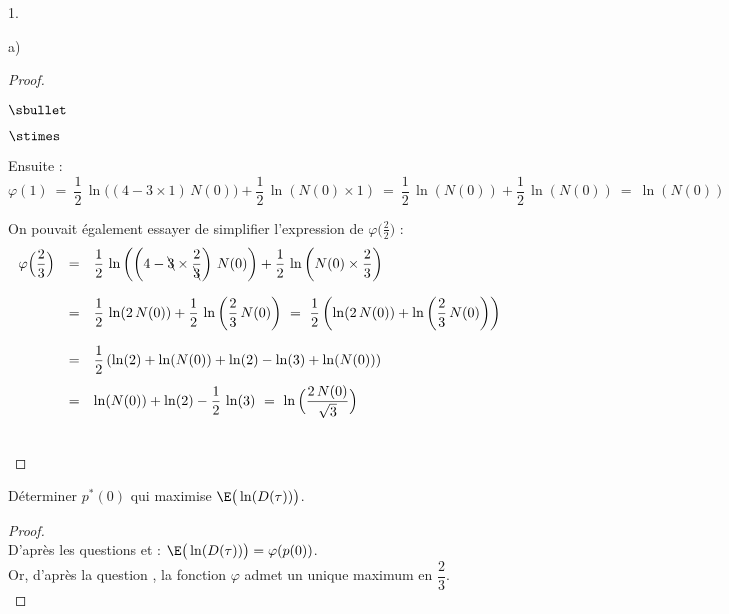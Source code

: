 \begin{noliste}{1.}
\begin{noliste}{a)}
\begin{proof}
\begin{noliste}{$\sbullet$}
\begin{noliste}{$\stimes$}
	\item Ensuite :
	\[
	  \varphi(1) \ = \ \dfrac{1}{2} \, \ln\big( (4-3\times 1) \,
	  N(0)\big) + \dfrac{1}{2} \, \ln(N(0) \times 1) \ = \
	  \dfrac{1}{2} \, \ln(N(0)) + \dfrac{1}{2} \, \ln(N(0))
	  \ = \ \ln(N(0))
	\]
      \end{noliste}
      \end{noliste}
      
      \begin{remark}
        On pouvait également essayer de simplifier l'expression de 
        $\varphi\big(\frac{2}{2}\big)$ :
        \[
          \begin{array}{rcl}
            \varphi\Big(\dfrac{2}{3}\Big) &=& \dfrac{1}{2} \, \ln\left( 
	    \left(4 - \bcancel{3} \times \dfrac{2}{\bcancel{3}}\right) 
	    \, N(0)\right) + \dfrac{1}{2} \, \ln\left(N(0) \times 
	    \dfrac{2}{3}\right)
	    \\[.6cm]
	    &=& \dfrac{1}{2} \, \ln(2 \, N(0)) + \dfrac{1}{2} \, \ln
	    \left( \dfrac{2}{3} \, N(0)\right) \ = \ \dfrac{1}{2}
	    \left(\ln(2 \, N(0)) + \ln\left(\dfrac{2}{3} \, N(0)\right)
	    \right)
	    \\[.6cm]
	    &=& \dfrac{1}{2} \left( \ln(2) + \ln(N(0)) + \ln(2) - \ln(3)
	    + \ln(N(0)) \right)
	    \\[.4cm]
	    &=& \ln(N(0)) + \ln(2) - \dfrac{1}{2} \, \ln(3)
	    \ = \ \ln\Big( \dfrac{2 \, N(0)}{\sqrt{3}}\Big)
          \end{array}
        \]
      \end{remark}~\\[-1.4cm]
    \end{proof}
    
    
    \newpage

    
    \item Déterminer $p^*(0)$ qui maximise $\E\big(\ln(D(\tau))\big)$.
    
    \begin{proof}~\\
      D'après les questions  et  : $\E\big(
      \ln(D(\tau))\big) = \varphi(p(0))$.\\
      Or, d'après la question , la fonction $\varphi$
      admet un unique maximum en $\dfrac{2}{3}$.
      ~\\[-1cm]
    \end{proof}
  \end{noliste}
\end{noliste}




